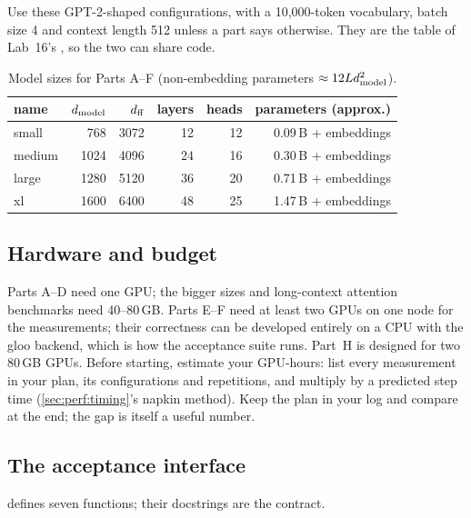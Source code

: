 Use these GPT-2-shaped configurations, with a 10{,}000-token vocabulary, batch size 4 and context
length 512 unless a part says otherwise. They are the  table of Lab~16's
, so the two can share code.

\begin{table}[h]
\centering\small
\begin{tabular}{lrrrrr}
\toprule
name & $d_{\text{model}}$ & $d_{\text{ff}}$ & layers & heads & parameters (approx.)\\
\midrule
small  & 768  & 3072 & 12 & 12 & 0.09\,B + embeddings\\
medium & 1024 & 4096 & 24 & 16 & 0.30\,B + embeddings\\
large  & 1280 & 5120 & 36 & 20 & 0.71\,B + embeddings\\
xl     & 1600 & 6400 & 48 & 25 & 1.47\,B + embeddings\\
\bottomrule
\end{tabular}
\caption{Model sizes for Parts A--F (non-embedding parameters $\approx12Ld_{\text{model}}^2$).}
\label{tab:proj2:sizes}
\end{table}

\subsection{Hardware and budget}

Parts A--D need one GPU; the bigger sizes and long-context attention benchmarks need 40--80\,GB.
Parts E--F need at least two GPUs on one node for the measurements; their correctness can be
developed entirely on a CPU with the gloo backend, which is how the acceptance suite runs. Part~H is
designed for two 80\,GB GPUs. Before starting, estimate your GPU-hours: list every measurement in
your plan, its configurations and repetitions, and multiply by a predicted step time
(\cref{sec:perf:timing}'s napkin method). Keep the plan in your log and compare at the end; the gap is
itself a useful number.

\subsection{The acceptance interface}

 defines seven functions; their docstrings are the contract.

